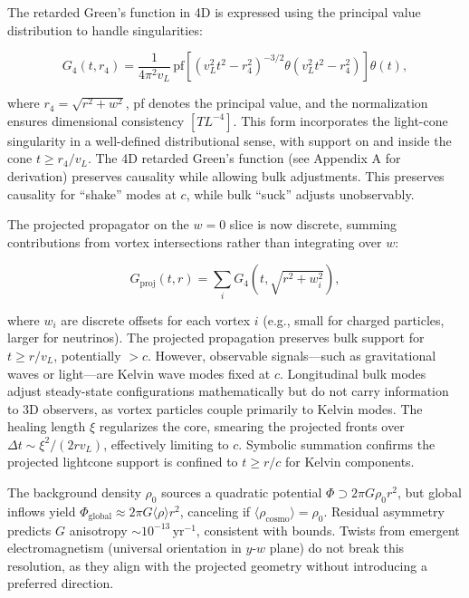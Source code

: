 The retarded Green's function in 4D is expressed using the principal value distribution to handle singularities:

\begin{equation}
G_4(t, r_4) = \frac{1}{4 \pi^2 v_L} \, \text{pf} \left[ (v_L^2 t^2 - r_4^2)^{-3/2} \theta(v_L^2 t^2 - r_4^2) \right] \theta(t),
\end{equation}

where $r_4 = \sqrt{r^2 + w^2}$, pf denotes the principal value, and the normalization ensures dimensional consistency $[T L^{-4}]$. This form incorporates the light-cone singularity in a well-defined distributional sense, with support on and inside the cone $t \geq r_4 / v_L$. The 4D retarded Green's function (see Appendix A for derivation) preserves causality while allowing bulk adjustments. This preserves causality for ``shake'' modes at $c$, while bulk ``suck'' adjusts unobservably.

The projected propagator on the $w=0$ slice is now discrete, summing contributions from vortex intersections rather than integrating over $w$:

\begin{equation}
G_{\text{proj}}(t, r) = \sum_i G_4(t, \sqrt{r^2 + w_i^2}),
\end{equation}

where $w_i$ are discrete offsets for each vortex $i$ (e.g., small for charged particles, larger for neutrinos). The projected propagation preserves bulk support for $t \geq r / v_L$, potentially $>c$. However, observable signals---such as gravitational waves or light---are Kelvin wave modes fixed at $c$. Longitudinal bulk modes adjust steady-state configurations mathematically but do not carry information to 3D observers, as vortex particles couple primarily to Kelvin modes. The healing length $\xi$ regularizes the core, smearing the projected fronts over $\Delta t \sim \xi^2 / (2 r v_L)$, effectively limiting to $c$. Symbolic summation confirms the projected lightcone support is confined to $t \geq r / c$ for Kelvin components.

The background density $\rho_0$ sources a quadratic potential $\Phi \supset 2\pi G \rho_0 r^2$, but global inflows yield $\Phi_{\text{global}} \approx 2\pi G \langle \rho \rangle r^2$, canceling if $\langle \rho_{\text{cosmo}} \rangle = \rho_0$. Residual asymmetry predicts $G$ anisotropy $\sim 10^{-13} \,\mathrm{yr}^{-1}$, consistent with bounds. Twists from emergent electromagnetism (universal orientation in $y$-$w$ plane) do not break this resolution, as they align with the projected geometry without introducing a preferred direction.

